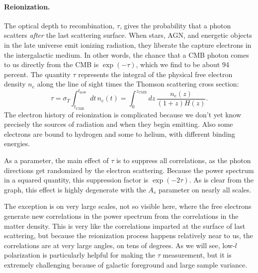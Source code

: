 \paragraph{Reionization.}  The optical depth to recombination, $\tau$, gives the probability that a photon scatters \textit{after} the last scattering surface.  When stars, AGN, and energetic objects in the late universe emit ionizing radiation, they liberate the capture electrons in the intergalactic medium.  In other words, the chance that a CMB photon comes to us directly from the CMB is $\exp(-\tau)$, which we find to be about 94 percent.  The quantity $\tau$ represents the integral of the physical free electron density $n_e$ along the line of sight times the Thomson scattering cross section:
\begin{equation}
  \tau = \sigma_T \int_{t_\textrm{CMB}}^{t_\textrm{now}} dt\,n_e(t) = \int_0^{z_\textrm{CMB}} dz\, \frac{n_e(z)}{(1+z) H(z)}.
\end{equation}
The electron history of reionization is complicated because we don't yet know precisely the sources of radiation and when they begin emitting.  Also some electrons are bound to hydrogen and some to helium, with different binding energies.



As a parameter, the main effect of $\tau$ is to suppress all correlations, as the photon directions get randomized by the electron scattering.  Because the power spectrum in a squared quantity, this suppression factor is $\exp(-2\tau)$.  As is clear from the graph, this effect is highly degenerate with the $A_s$ parameter on nearly all scales.

The exception is on very large scales, not so visible here, where the free electrons generate new correlations in the power spectrum from the correlations in the matter density.  This is very like the correlations imparted at the surface of last scattering, but because the reionization process happens relatively near to us, the correlations are at very large angles, on tens of degrees.  As we will see, low-$l$ polarization is particularly helpful for making the $\tau$ measurement, but it is extremely challenging because of galactic foreground and large sample variance.

